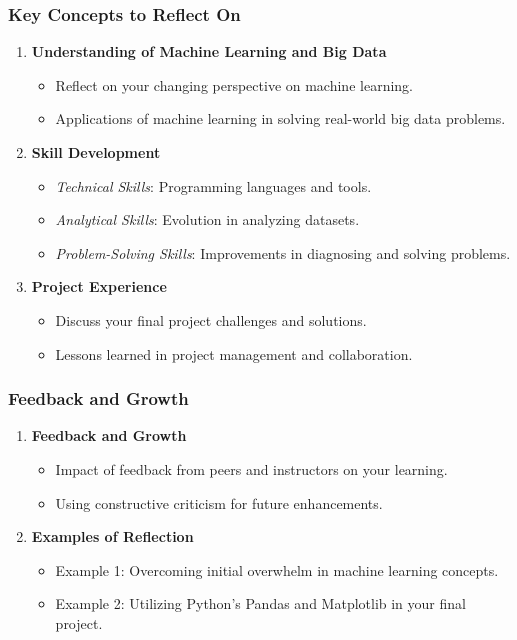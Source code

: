 \documentclass[aspectratio=169]{beamer}
\begin{document}
\begin{frame}[fragile]
    \frametitle{Key Concepts to Reflect On}
    \begin{enumerate}
        \item \textbf{Understanding of Machine Learning and Big Data}
            \begin{itemize}
                \item Reflect on your changing perspective on machine learning.
                \item Applications of machine learning in solving real-world big data problems.
            \end{itemize}
        \item \textbf{Skill Development}
            \begin{itemize}
                \item \textit{Technical Skills}: Programming languages and tools.
                \item \textit{Analytical Skills}: Evolution in analyzing datasets.
                \item \textit{Problem-Solving Skills}: Improvements in diagnosing and solving problems.
            \end{itemize}
        \item \textbf{Project Experience}
            \begin{itemize}
                \item Discuss your final project challenges and solutions.
                \item Lessons learned in project management and collaboration.
            \end{itemize}
    \end{enumerate}
\end{frame}

\begin{frame}[fragile]
    \frametitle{Feedback and Growth}
    \begin{enumerate}
        \item \textbf{Feedback and Growth}
            \begin{itemize}
                \item Impact of feedback from peers and instructors on your learning.
                \item Using constructive criticism for future enhancements.
            \end{itemize}
        \item \textbf{Examples of Reflection}
            \begin{itemize}
                \item Example 1: Overcoming initial overwhelm in machine learning concepts.
                \item Example 2: Utilizing Python's Pandas and Matplotlib in your final project.
            \end{itemize}
    \end{enumerate}
\end{frame}
\end{document}

